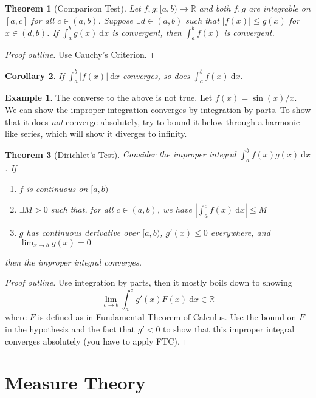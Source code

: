 \documentclass[letterpaper,12pt]{article}
\theoremstyle{definition}
\newtheorem{example}{Example}[section]
\theoremstyle{plain}
\newtheorem{thm}{Theorem}[section]
\newtheorem{corollary}[thm]{Corollary}
\theoremstyle{remark}
\newcommand{\R}{\mathbb{R}}
\begin{document}
\begin{thm}[Comparison Test]
Let $f,g:[a,b)\to \mathbb{R}$ and both $f,g$ are integrable on $[a,c]$ for all $c\in(a,b)$. Suppose $\exists d\in(a,b)$ such that $|f(x)|\leq g(x)$ for $x\in(d,b)$. If $\int_a^b g(x)\ \mathrm{d}x$ is convergent, then $\int_a^b f(x)$ is convergent.
\end{thm}

\begin{proof}[Proof outline]
Use Cauchy's Criterion.
\end{proof}

\begin{corollary}
If $\int_a^b |f(x)|\ \mathrm{d}x$ converges, so does $\int_a^b f(x)\ \mathrm{d}x$.
\end{corollary}

\begin{example}
The converse to the above is not true. Let $f(x) = \sin(x)/x$. We can show the improper integration converges by integration by parts. To show that it does \emph{not} converge absolutely, try to bound it below through a harmonic-like series, which will show it diverges to infinity.
\end{example}

\begin{thm}[Dirichlet's Test]
Consider the improper integral $\int_a^b f(x)g(x)\ \mathrm{d}x$. If
\begin{enumerate}
  \item $f$ is continuous on $[a,b)$
  \item $\exists M>0$ such that, for all $c\in(a,b)$, we have $\left|\int_a^c f(x)\ \mathrm{d}x\right|\leq M$
  \item $g$ has continuous derivative over $[a,b)$, $g'(x)\leq 0$ everywhere, and $\lim_{x\to b}g(x)=0$
\end{enumerate}
then the improper integral converges.
\end{thm}
\begin{proof}[Proof outline]
Use integration by parts, then it mostly boils down to showing 
\[\lim_{c\to b}\int_{a}^{c} g'(x)F(x) \ \mathrm{d}x \in \R\]
where $F$ is defined as in Fundamental Theorem of Calculus. Use the bound on $F$ in the hypothesis and the fact that $g'<0$ to show that this improper integral converges absolutely (you have to apply FTC).
\end{proof}

\newpage
\part{Measure Theory}
\end{document}
